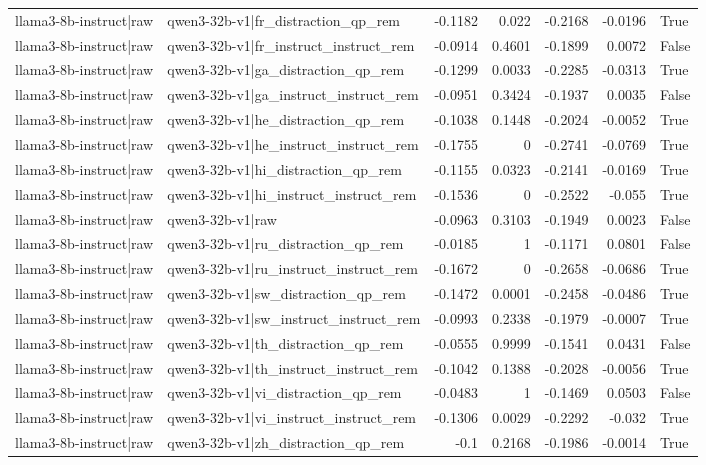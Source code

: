\begin{table}
\begin{tabular}{l l r r r r l}
llama3-8b-instruct|raw & qwen3-32b-v1|fr_distraction_qp_rem & -0.1182 & 0.022 & -0.2168 & -0.0196 & True \\
llama3-8b-instruct|raw & qwen3-32b-v1|fr_instruct_instruct_rem & -0.0914 & 0.4601 & -0.1899 & 0.0072 & False \\
llama3-8b-instruct|raw & qwen3-32b-v1|ga_distraction_qp_rem & -0.1299 & 0.0033 & -0.2285 & -0.0313 & True \\
llama3-8b-instruct|raw & qwen3-32b-v1|ga_instruct_instruct_rem & -0.0951 & 0.3424 & -0.1937 & 0.0035 & False \\
llama3-8b-instruct|raw & qwen3-32b-v1|he_distraction_qp_rem & -0.1038 & 0.1448 & -0.2024 & -0.0052 & True \\
llama3-8b-instruct|raw & qwen3-32b-v1|he_instruct_instruct_rem & -0.1755 & 0 & -0.2741 & -0.0769 & True \\
llama3-8b-instruct|raw & qwen3-32b-v1|hi_distraction_qp_rem & -0.1155 & 0.0323 & -0.2141 & -0.0169 & True \\
llama3-8b-instruct|raw & qwen3-32b-v1|hi_instruct_instruct_rem & -0.1536 & 0 & -0.2522 & -0.055 & True \\
llama3-8b-instruct|raw & qwen3-32b-v1|raw & -0.0963 & 0.3103 & -0.1949 & 0.0023 & False \\
llama3-8b-instruct|raw & qwen3-32b-v1|ru_distraction_qp_rem & -0.0185 & 1 & -0.1171 & 0.0801 & False \\
llama3-8b-instruct|raw & qwen3-32b-v1|ru_instruct_instruct_rem & -0.1672 & 0 & -0.2658 & -0.0686 & True \\
llama3-8b-instruct|raw & qwen3-32b-v1|sw_distraction_qp_rem & -0.1472 & 0.0001 & -0.2458 & -0.0486 & True \\
llama3-8b-instruct|raw & qwen3-32b-v1|sw_instruct_instruct_rem & -0.0993 & 0.2338 & -0.1979 & -0.0007 & True \\
llama3-8b-instruct|raw & qwen3-32b-v1|th_distraction_qp_rem & -0.0555 & 0.9999 & -0.1541 & 0.0431 & False \\
llama3-8b-instruct|raw & qwen3-32b-v1|th_instruct_instruct_rem & -0.1042 & 0.1388 & -0.2028 & -0.0056 & True \\
llama3-8b-instruct|raw & qwen3-32b-v1|vi_distraction_qp_rem & -0.0483 & 1 & -0.1469 & 0.0503 & False \\
llama3-8b-instruct|raw & qwen3-32b-v1|vi_instruct_instruct_rem & -0.1306 & 0.0029 & -0.2292 & -0.032 & True \\
llama3-8b-instruct|raw & qwen3-32b-v1|zh_distraction_qp_rem & -0.1 & 0.2168 & -0.1986 & -0.0014 & True \\

\end{tabular}
\end{table}
